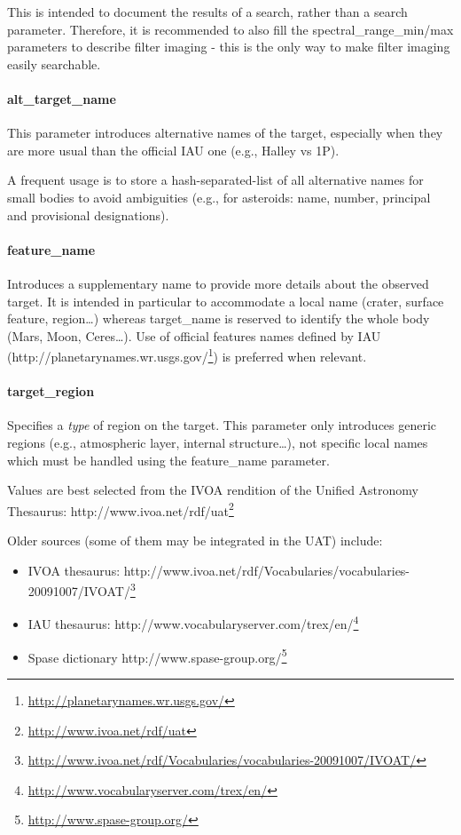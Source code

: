 \documentclass[11pt,a4paper]{ivoa}
\begin{document}
This is intended to document the results of a search, rather than a search parameter. Therefore, it is recommended to also fill the spectral\_range\_min/max parameters to describe filter imaging - this is the only way to make filter imaging easily searchable.

\paragraph{alt\_target\_name}

This parameter introduces alternative names of the target, especially when they are more usual than the official IAU one (e.g., Halley vs 1P).

A frequent usage is to store a hash-separated-list of all alternative names for small bodies to avoid ambiguities (e.g., for asteroids: name, number, principal and provisional designations).

\paragraph{feature\_name}

Introduces a supplementary name to provide more details about the observed target. It is intended in particular to accommodate a local name (crater, surface feature, region…) whereas target\_name is reserved to identify the whole body (Mars, Moon, Ceres…). Use of official features names defined by IAU (http://planetarynames.wr.usgs.gov/\footnote{\url{http://planetarynames.wr.usgs.gov/}}) is preferred when relevant.

\paragraph{target\_region}

Specifies a \emph{type} of region on the target. This parameter only introduces generic regions  (e.g., atmospheric layer, internal structure…), not specific local names which must be handled using the feature\_name parameter.

Values are best selected from the IVOA rendition of the Unified Astronomy Thesaurus: http://www.ivoa.net/rdf/uat\footnote{\url{http://www.ivoa.net/rdf/uat}}

Older sources (some of them may be integrated in the UAT) include:

\begin{itemize}
\item IVOA thesaurus: http://www.ivoa.net/rdf/Vocabularies/vocabularies-20091007/IVOAT/\footnote{\url{http://www.ivoa.net/rdf/Vocabularies/vocabularies-20091007/IVOAT/}}
\item IAU thesaurus: http://www.vocabularyserver.com/trex/en/\footnote{\url{http://www.vocabularyserver.com/trex/en/}}
\item Spase dictionary http://www.spase-group.org/\footnote{\url{http://www.spase-group.org/}}
\end{itemize}
\end{document}
